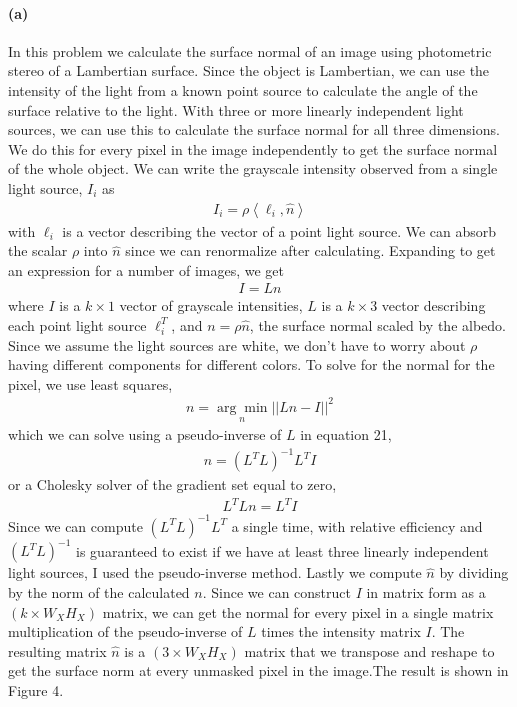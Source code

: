 \documentclass{article}
\newcommand{\spart}[1]{\paragraph{(#1)}}
\begin{document}
\spart{a} In this problem we calculate the surface normal of an image using photometric stereo of a Lambertian surface. Since the object is Lambertian, we can use the intensity of the light from a known point source to calculate the angle of the surface relative to the light. With three or more linearly independent light sources, we can use this to calculate the surface normal for all three dimensions. We do this for every pixel in the image independently to get the surface normal of the whole object. We can write the grayscale intensity observed from a single light source, $I_i$ as
\begin{align}
	I_i = \rho \left< \ell_i,\hat{n} \right>
\end{align}
with $\ell_i$ is a vector describing the vector of a point light source. We can absorb the scalar $\rho$ into $\hat{n}$ since we can renormalize after calculating. Expanding to get an expression for a number of images, we get 
\begin{align}
	I = L n 
\end{align}
where $I$ is a $k\times1$ vector of grayscale intensities, $L$ is a $k\times 3$ vector describing each point light source $\ell_i^T$, and $n=\rho \hat{n}$, the surface normal scaled by the albedo. Since we assume the light sources are white, we don't have to worry about $\rho$ having different components for different colors. To solve for the normal for the pixel, we use least squares, 
\begin{align}
	n = \underset{n}{\arg\min} ||Ln-I||^2
\end{align}
which we can solve using a pseudo-inverse of $L$ in equation 21,
\begin{align}
	n = (L^TL)^{-1}L^TI
\end{align}
or a Cholesky solver of the gradient set equal to zero,
\begin{align}
	L^TL n = L^TI
\end{align}
Since we can compute $(L^TL)^{-1}L^T$ a single time, with relative efficiency and $(L^TL)^{-1}$ is guaranteed to exist if we have at least three linearly independent light sources, I used the pseudo-inverse method. Lastly we compute $\hat{n}$ by dividing by the norm of the calculated $n$. Since we can construct $I$ in matrix form as a $(k\times W_XH_X)$ matrix, we can get the normal for every pixel in a single matrix multiplication of the pseudo-inverse of $L$ times the intensity matrix $I$. The resulting matrix $\hat{n}$ is a $(3\times W_XH_X)$ matrix that we transpose and reshape to get the surface norm at every unmasked pixel in the image.The result is shown in Figure 4.
\end{document}
